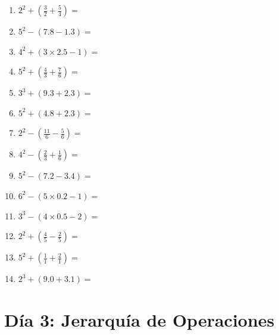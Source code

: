 \documentclass[12pt]{article}
\begin{document}
\begin{enumerate}
\item \large $ 2^{2} + (\frac{3}{2} + \frac{5}{4}) = $ \vspace{1.4cm}
\item \large $ 5^{2} - (7.8 - 1.3) = $ \vspace{1.4cm}
\newpage
\item \large $ 4^{2} + (3 \times 2.5 - 1) = $ \vspace{1.4cm}
\item \large $ 5^{2} + (\frac{4}{3} + \frac{7}{6}) = $ \vspace{1.4cm}
\item \large $ 3^{3} + (9.3 + 2.3) = $ \vspace{1.4cm}
\item \large $ 5^{2} + (4.8 + 2.3) = $ \vspace{1.4cm}
\item \large $ 2^{2} - (\frac{11}{6} - \frac{5}{6}) = $ \vspace{1.4cm}
\item \large $ 4^{2} - (\frac{2}{3} + \frac{1}{6}) = $ \vspace{1.4cm}
\item \large $ 5^{2} - (7.2 - 3.4) = $ \vspace{1.4cm}
\item \large $ 6^{2} - (5 \times 0.2 - 1) = $ \vspace{1.4cm}
\item \large $ 3^{3} - (4 \times 0.5 - 2) = $ \vspace{1.4cm}
\item \large $ 2^{2} + (\frac{4}{5} - \frac{2}{5}) = $ \vspace{1.4cm}
\newpage
\item \large $ 5^{2} + (\frac{1}{1} + \frac{2}{1}) = $ \vspace{1.4cm}
\item \large $ 2^{3} + (9.0 + 3.1) = $ \vspace{1.4cm}
\end{enumerate}
\newpage
\section*{Día 3: Jerarquía de Operaciones}
\end{document}
